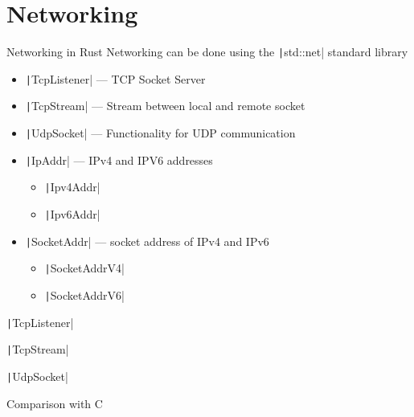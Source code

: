 \section{Networking}
\begin{frame}{Networking in Rust}
    \pause
    Networking can be done using the \texttt|std::net| standard
    library
    \pause
    \begin{itemize}[<+->]
        \item \texttt|TcpListener| --- TCP Socket Server
        \item \texttt|TcpStream| --- Stream between local and remote socket
        \item \texttt|UdpSocket| --- Functionality for UDP communication
        \item \texttt|IpAddr| --- IPv4 and IPV6 addresses
        \begin{itemize}[<+->]
            \item \texttt|Ipv4Addr|
            \item \texttt|Ipv6Addr|
        \end{itemize}
        \item \texttt|SocketAddr| --- socket address of IPv4 and IPv6
        \begin{itemize}[<+->]
            \item \texttt|SocketAddrV4|
            \item \texttt|SocketAddrV6|
        \end{itemize}
    \end{itemize}
\end{frame}

\begin{frame}{\texttt|TcpListener|}
\end{frame}

\begin{frame}{\texttt|TcpStream|}
\end{frame}

\begin{frame}{\texttt|UdpSocket|}
\end{frame}

\begin{frame}{Comparison with C}
\end{frame}